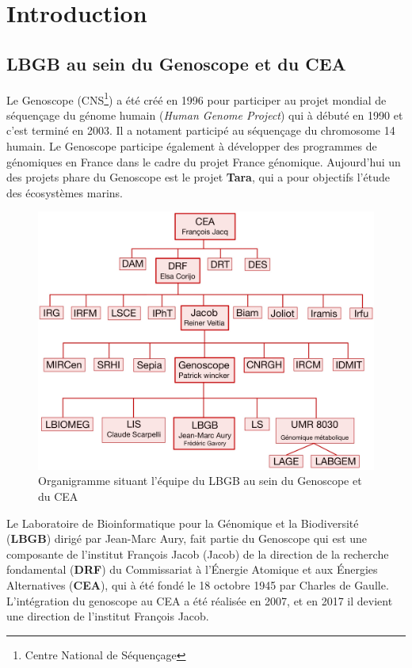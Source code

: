 \section{Introduction}
\subsection{LBGB au sein du Genoscope et du CEA}
Le Genoscope (CNS\footnote{Centre National de Séquençage}) a été créé en 1996 pour participer au projet mondial de séquençage du génome humain (\emph{Human Genome Project}) qui à débuté en 1990 et c'est terminé en 2003. Il a notament participé au séquençage du chromosome 14 humain. Le Genoscope participe également à développer des programmes de génomiques en France dans le cadre du projet France génomique. Aujourd'hui un des projets phare du Genoscope est le projet \textbf{Tara}, qui a pour objectifs l'étude des écosystèmes marins.

\begin{minipage}{0.40\textwidth}
\begin{figure}[H]
    \centering
    \includegraphics[width=1\textwidth]{img/organigramme.jpg}
    \caption{Organigramme situant l’équipe du LBGB au sein du Genoscope et du CEA}
    \label{organigramme_LBGB}
\end{figure}
\end{minipage} 
\hfill
\begin{minipage}{0.5\textwidth}
    Le Laboratoire de Bioinformatique pour la Génomique et la Biodiversité (\textbf{LBGB}) dirigé par Jean-Marc Aury, fait partie du Genoscope qui est une composante de l'institut François Jacob (Jacob) de la direction de la recherche fondamental (\textbf{DRF}) du Commissariat à l'Énergie Atomique et aux Énergies Alternatives (\textbf{CEA}), qui à été fondé le 18 octobre 1945 par Charles de Gaulle. L'intégration du genoscope au CEA a été réalisée en 2007, et en 2017 il devient une direction de l'institut François Jacob.
\end{minipage}

